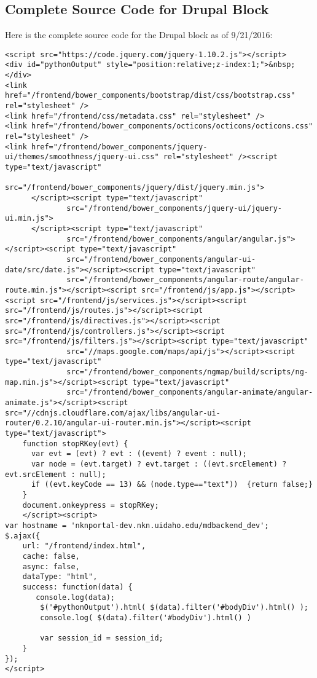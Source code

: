 \documentclass[a4paper, 12pt]{article}
\begin{document}
\subsection{Complete Source Code for Drupal Block}
\par\indent
Here is the complete source code for the Drupal block as of 9/21/2016:
\begin{lstlisting}
<script src="https://code.jquery.com/jquery-1.10.2.js"></script>
<div id="pythonOutput" style="position:relative;z-index:1;">&nbsp;</div>
<link href="/frontend/bower_components/bootstrap/dist/css/bootstrap.css" rel="stylesheet" />
<link href="/frontend/css/metadata.css" rel="stylesheet" />
<link href="/frontend/bower_components/octicons/octicons/octicons.css" rel="stylesheet" />
<link href="/frontend/bower_components/jquery-ui/themes/smoothness/jquery-ui.css" rel="stylesheet" /><script type="text/javascript"
              src="/frontend/bower_components/jquery/dist/jquery.min.js">
      </script><script type="text/javascript"
              src="/frontend/bower_components/jquery-ui/jquery-ui.min.js">
      </script><script type="text/javascript"
              src="/frontend/bower_components/angular/angular.js"></script><script type="text/javascript"
              src="/frontend/bower_components/angular-ui-date/src/date.js"></script><script type="text/javascript"
              src="/frontend/bower_components/angular-route/angular-route.min.js"></script><script src="/frontend/js/app.js"></script><script src="/frontend/js/services.js"></script><script src="/frontend/js/routes.js"></script><script src="/frontend/js/directives.js"></script><script src="/frontend/js/controllers.js"></script><script src="/frontend/js/filters.js"></script><script type="text/javascript"
              src="//maps.google.com/maps/api/js"></script><script type="text/javascript"
              src="/frontend/bower_components/ngmap/build/scripts/ng-map.min.js"></script><script type="text/javascript"
              src="/frontend/bower_components/angular-animate/angular-animate.js"></script><script src="//cdnjs.cloudflare.com/ajax/libs/angular-ui-router/0.2.10/angular-ui-router.min.js"></script><script type="text/javascript">
    function stopRKey(evt) {
      var evt = (evt) ? evt : ((event) ? event : null);
      var node = (evt.target) ? evt.target : ((evt.srcElement) ? evt.srcElement : null);
      if ((evt.keyCode == 13) && (node.type=="text"))  {return false;}
    }
    document.onkeypress = stopRKey;
    </script><script>
var hostname = 'nknportal-dev.nkn.uidaho.edu/mdbackend_dev';
$.ajax({
    url: "/frontend/index.html",
    cache: false,
    async: false,
    dataType: "html",
    success: function(data) {
       console.log(data);
        $('#pythonOutput').html( $(data).filter('#bodyDiv').html() );
        console.log( $(data).filter('#bodyDiv').html() )

        var session_id = session_id;     
    }
});
</script>
\end{lstlisting}
\end{document}
